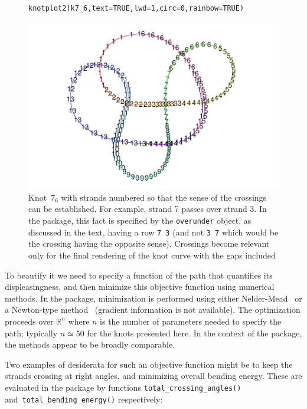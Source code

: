 \documentclass{birkjour}
\theoremstyle{definition}
\theoremstyle{remark}
\numberwithin{equation}{section}
\begin{document}
\begin{figure}[!tbp]
\begin{verbatim}
knotplot2(k7_6,text=TRUE,lwd=1,circ=0,rainbow=TRUE)
\end{verbatim}
 \centering
\includegraphics[scale = 0.9]{knot-004}
\caption{Knot~$7_6$ with strands numbered \label{k76_strands} so that
  the sense of the crossings can be established.  For example, strand
  7 passes over strand 3.  In the package, this fact is specified by
  the {\tt overunder} object, as discussed in the text, having a row
  {\tt 7 3} (and not {\tt 3 7} which would be the crossing having the
  opposite sense).  Crossings become relevant only for the final
  rendering of the knot curve with the gaps included}
\end{figure}

To beautify it we need to specify a function of the path that
quantifies its displeasingness, and then minimize this objective
function using numerical methods.  In the package, minimization is
performed using either Nelder-Mead~\cite{nelder1965} or a Newton-type
method~\cite{dennis1983} (gradient information is not available).  The
optimization proceeds over $\mathbb{R}^n$ where $n$ is the number of
parameters needed to specify the path; typically $n\simeq 50$ for the
knots presented here.  In the context of the package, the methods
appear to be broadly comparable.

Two examples of desiderata for such an objective function might be to
keep the strands crossing at right angles, and minimizing overall bending
energy.  These are evaluated in the package by functions
{\tt total\_crossing\_angles()} and~{\tt total\_bending\_energy()}
respectively:
\end{document}

